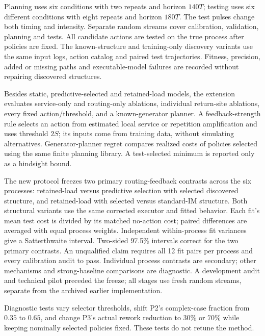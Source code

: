 Planning uses six conditions with two repeats and horizon $140T$; testing uses six different conditions with eight repeats and horizon $180T$. The test pulses change both timing and intensity. Separate random streams cover calibration, validation, planning and tests. All candidate actions are tested on the true process after policies are fixed. The known-structure and training-only discovery variants use the same input logs, action catalog and paired test trajectories. Fitness, precision, added or missing paths and executable-model failures are recorded without repairing discovered structures.

Besides static, predictive-selected and retained-load models, the extension evaluates service-only and routing-only ablations, individual return-site ablations, every fixed action/threshold, and a known-generator planner. A feedback-strength rule selects an action from estimated local service or repetition amplification and uses threshold $2S$; its inputs come from training data, without simulating alternatives. Generator-planner regret compares realized costs of policies selected using the same finite planning library. A test-selected minimum is reported only as a hindsight bound.

The new protocol freezes two primary routing-feedback contrasts across the six processes: retained-load versus predictive selection with selected discovered structure, and retained-load with selected versus standard-IM structure. Both structural variants use the same corrected executor and fitted behavior. Each fit's mean test cost is divided by its matched no-action cost; paired differences are averaged with equal process weights. Independent within-process fit variances give a Satterthwaite interval. Two-sided 97.5\% intervals correct for the two primary contrasts. An unqualified claim requires all 12 fit pairs per process and every calibration audit to pass. Individual process contrasts are secondary; other mechanisms and strong-baseline comparisons are diagnostic. A development audit and technical pilot preceded the freeze; all stages use fresh random streams, separate from the archived earlier implementation.

Diagnostic tests vary selector thresholds, shift P2's complex-case fraction from $0.35$ to $0.65$, and change P3's actual rework reduction to $30\%$ or $70\%$ while keeping nominally selected policies fixed. These tests do not retune the method.

